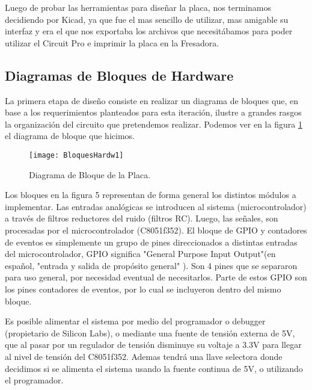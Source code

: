 Luego de probar las herramientas para diseñar la placa, nos terminamos decidiendo por Kicad, ya que fue el mas sencillo de utilizar, mas amigable su interfaz y era el que nos exportaba los archivos que necesitábamos para poder utilizar el Circuit Pro e imprimir la placa en la Fresadora.


\subsection{Diagramas de Bloques de Hardware}
\label{diagra_bloques_hardware}

La primera etapa de diseño consiste en realizar un diagrama de bloques que, en base a los requerimientos planteados para esta iteración, ilustre a grandes rasgos la organización del circuito que pretendemos realizar.
Podemos ver en la figura \ref{fig:BloquesHardw1} el diagrama de bloque que hicimos.

\begin{figure}[h]
  \centering
  \texttt{[image: BloquesHardw1]}
  \caption{Diagrama de Bloque de la Placa.}\label{fig:BloquesHardw1}
\end{figure}

Los bloques en la figura 5 representan de forma general los distintos módulos a implementar. Las entradas analógicas se introducen al sistema (microcontrolador) a través de filtros reductores del ruido (filtros RC). Luego, las señales, son procesadas por el microcontrolador (C8051f352). El bloque de GPIO y contadores de eventos es simplemente un grupo de pines direccionados a distintas entradas del microcontrolador, GPIO significa "General Purpose Input Output"(en español, "entrada y salida de propósito general" ). Son 4 pines que se separaron para uso general, por necesidad eventual de necesitarlos. Parte de estos GPIO son los pines contadores de eventos, por lo cual se incluyeron dentro del mismo bloque.

Es posible alimentar el sistema por medio del programador o debugger (propietario de Silicon Labs), o mediante una fuente de tensión externa de 5V, que al pasar por un regulador de tensión disminuye su voltaje a 3.3V para llegar al nivel de tensión del C8051f352. Ademas tendrá una llave selectora donde decidimos si se alimenta el sistema usando la fuente continua de 5V, o utilizando el programador.


